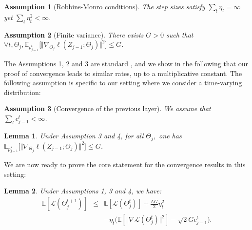 \documentclass{article}
\newtheorem{assumption}{Assumption}
\newtheorem{lemma}{Lemma}[section]
\begin{document}
 \begin{assumption}[Robbins-Monro conditions] The step sizes satisfy $\sum_t\eta_t=\infty$ yet $\sum_t\eta_t^2<\infty$.\end{assumption}
 
\begin{assumption}[Finite variance] There exists $G>0$ such that $\forall t,\Theta_j, \mathbb{E}_{p^t_{j-1}}\big[\Vert\nabla_{\Theta_j}\ell(Z_{j-1};\Theta_j)\Vert^2\big]\leq G$.\end{assumption}


The Assumptions 1, 2 and 3 are standard \citep{bottou2018optimization, Huo2018}, and we show in the following  that our proof of convergence leads to similar rates, up to a multiplicative constant. The following assumption is specific to our setting where we consider a time-varying distribution:
\begin{assumption}[Convergence of the previous layer] We assume that $\sum_{t} c^t_{j-1}<\infty$.\end{assumption}
\begin{lemma}Under Assumption 3 and 4, for all $\Theta_j,$ one has $ \mathbb{E}_{p^*_{j-1}}\big[\Vert\nabla_{\Theta_j}\ell(Z_{j-1};\Theta_j)\Vert^2\big]\leq G$.\end{lemma}





We are now ready to prove the core statement for the convergence results in this setting:
\begin{lemma}\label{lemma:main}Under Assumptions 1, 3 and 4, we have:
\begin{eqnarray*}
\mathbb{E}[\mathcal{L}(\Theta_j^{t+1})] & \leq & \mathbb{E}[\mathcal{L}(\Theta_j^{t})]+\frac{LG}{2}\eta_t^2\,\\
{} & {} & -\eta_t\big(\mathbb{E}[\Vert\nabla\mathcal{L}(\Theta_j^t)\Vert^2] -\sqrt{2}Gc^t_{j-1}\big).
\end{eqnarray*}\end{lemma}
\end{document}

